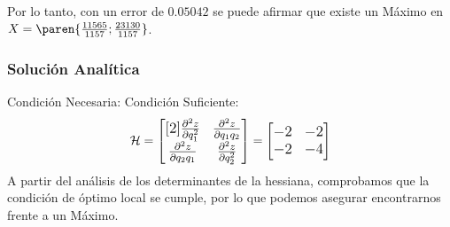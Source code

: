 \begin{homeworkProblem}
Por lo tanto, con un error de $0.05042$ se puede afirmar que existe un Máximo en $X=\paren{\frac{11565}{1157};\frac{23130}{1157}}$.


\subsubsection{Solución Analítica}
Condición Necesaria:
Condición Suficiente:\\
\begin{align*}
    \mathcal{H}=\large{\begin{bmatrix}[2]
        \frac{\partial^2 z}{\partial q_1^2}  & \frac{\partial^2 z}{\partial q_1q_2} \\
         \frac{\partial^2 z}{\partial q_2q_1} & \frac{\partial^2 z}{\partial q_2^2}
    \end{bmatrix}} = \begin{bmatrix}
        -2 & -2 \\ -2 & -4
    \end{bmatrix}
\end{align*}
A partir del análisis de los determinantes de la hessiana, comprobamos que la condición de óptimo local se cumple, por lo que podemos asegurar encontrarnos frente a un Máximo.
\end{homeworkProblem}